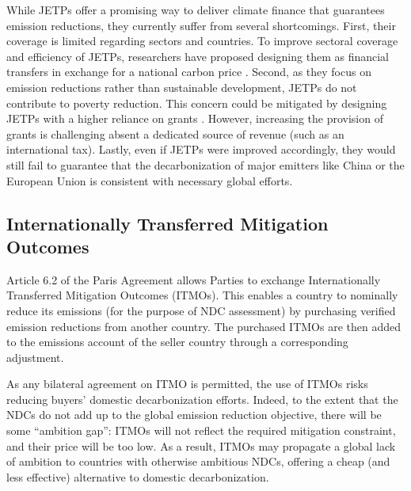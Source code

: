 \documentclass[12pt,english]{article}
\begin{document}
While JETPs offer a promising way to deliver climate finance that guarantees emission reductions, they currently suffer from several shortcomings. First, their coverage is limited regarding sectors and countries. To improve sectoral coverage and efficiency of JETPs, researchers have proposed designing them as financial transfers in exchange for a national carbon price \citep{steckel_climate_2017}. Second, as they focus on emission reductions rather than sustainable development, JETPs do not contribute to poverty reduction. This concern could be mitigated by designing JETPs with a higher reliance on grants \citep{bolton_why_2025}. However, increasing the provision of grants is challenging absent a dedicated source of revenue (such as an international tax).
Lastly, even if JETPs were improved accordingly, they would still fail to guarantee that the decarbonization of major emitters like China or the European Union is consistent with necessary global efforts. 

\subsection{Internationally Transferred Mitigation Outcomes\label{subsubsec:itmo}} 

Article 6.2 of the Paris Agreement allows Parties to exchange Internationally Transferred Mitigation Outcomes (ITMOs). This enables a country to nominally reduce its emissions (for the purpose of NDC assessment) %
by purchasing verified emission reductions from another country. %
The purchased ITMOs are then added to the emissions account of the seller country through a corresponding adjustment.

As any bilateral agreement on ITMO is permitted, the use of ITMOs risks reducing buyers' domestic decarbonization efforts. %
Indeed, to the extent that the NDCs do not add up to the global emission reduction objective, there will be some ``ambition gap'': %
ITMOs will not reflect the required mitigation constraint, and their price will be too low. As a result, ITMOs may propagate a global lack of ambition to countries with otherwise ambitious NDCs, offering a cheap (and less effective) alternative to domestic decarbonization. 
\end{document}
